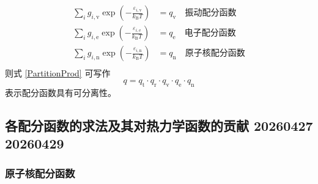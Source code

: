 \begin{enumerate}
\begin{equation*}
\begin{aligned}
            \sum_{i} g_{i,\mathrm{v}} \exp\left(-\frac{\varepsilon_{i,\mathrm{v}}}{k_\mathrm{B} T}\right) &= q_\mathrm{v} \quad \text{振动配分函数} \\
            \sum_{i} g_{i,\mathrm{e}} \exp\left(-\frac{\varepsilon_{i,\mathrm{e}}}{k_\mathrm{B} T}\right) &= q_\mathrm{e} \quad \text{电子配分函数} \\
            \sum_{i} g_{i,\mathrm{n}} \exp\left(-\frac{\varepsilon_{i,\mathrm{n}}}{k_\mathrm{B} T}\right) &= q_\mathrm{n} \quad \text{原子核配分函数} \\
        \end{aligned}
    \end{equation*}
    则式 \eqref{PartitionProd} 可写作
    \begin{equation}
        q = q_{\mathrm{t}} \cdot q_{\mathrm{r}} \cdot q_{\mathrm{v}} \cdot q_{\mathrm{e}} \cdot q_{\mathrm{n}}
    \end{equation}
    表示配分函数具有可分离性。
\end{enumerate}

\subsection{各配分函数的求法及其对热力学函数的贡献 20260427 20260429}

\subsubsection{原子核配分函数}

